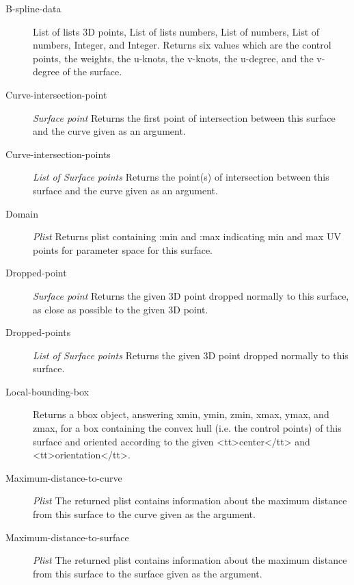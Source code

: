 \documentclass [11pt]{book}
\begin{document}
\begin{itemize}
\begin{description}
\item [B-spline-data]
List of lists 3D points, List of lists numbers, List of numbers,
List of numbers, Integer, and Integer.
Returns six values which are the control points, the weights, the u-knots,
the v-knots, the u-degree, and the v-degree of the surface.


\item [Curve-intersection-point]
\emph{Surface point} Returns the first point of intersection between
this surface and the curve given as an argument.


\item [Curve-intersection-points]
\emph{List of Surface points} Returns the point(s) of intersection between
this surface and the curve given as an argument.


\item [Domain]
\emph{Plist} Returns plist containing :min and :max indicating min and max UV points
for parameter space for this surface.


\item [Dropped-point]
\emph{Surface point} Returns the given 3D point dropped normally to this
surface, as close as possible to the given 3D point.


\item [Dropped-points]
\emph{List of Surface points} Returns the given 3D point dropped normally to this surface.


\item [Local-bounding-box]
Returns a bbox object, answering xmin, ymin, zmin, xmax, ymax, and zmax,
for a box containing the convex hull (i.e. the control points) of this
surface and oriented according to the given <tt>center</tt> and <tt>orientation</tt>.


\item [Maximum-distance-to-curve]
\emph{Plist} The returned plist contains information about the maximum
distance from this surface to the curve given as the argument.


\item [Maximum-distance-to-surface]
\emph{Plist} The returned plist contains information about the maximum
distance from this surface to the surface given as the argument.



\end{description}
\end{itemize}
\end{document}
